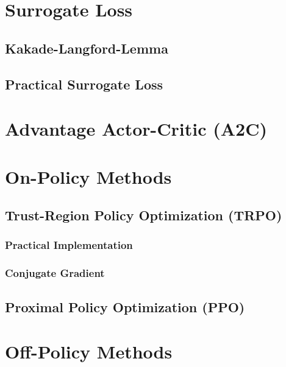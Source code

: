 	\section{Surrogate Loss} %

		\subsection{Kakade-Langford-Lemma} %

		\subsection{Practical Surrogate Loss} %

	\section{Advantage Actor-Critic (\acs{A2C})} %

	\section{On-Policy Methods} %

		\subsection{Trust-Region Policy Optimization (\acs{TRPO})} %

			\subsubsection{Practical Implementation} %

			\subsubsection{Conjugate Gradient} %

		\subsection{Proximal Policy Optimization (\acs{PPO})} %

	\section{Off-Policy Methods} %

